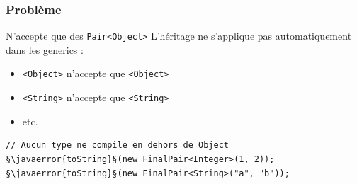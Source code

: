 \documentclass[draft]{beamer}
\makeatletter
\def\uwave{\bgroup\markoverwith{\lower4\p@\hbox{\sixly \textcolor{errorcolor}{\char58}}}\ULon}
\newcommand{\javaerror}[1]{%
  \uwave{#1}%
}
\makeatother
\begin{document}
\begin{frame}[fragile]
\frametitle{Problème}
\begin{alertblock}{N'accepte que des \lstinline{Pair<Object>}}
 L'héritage ne s'applique pas automatiquement dans les generics :
 \begin{itemize}
  \item \lstinline{<Object>} n'accepte que \lstinline{<Object>}
  \item \lstinline{<String>} n'accepte que \lstinline{<String>}
  \item etc.
 \end{itemize}
\end{alertblock}
\begin{lstlisting}
// Aucun type ne compile en dehors de Object
§\javaerror{toString}§(new FinalPair<Integer>(1, 2));
§\javaerror{toString}§(new FinalPair<String>("a", "b"));
\end{lstlisting}
\end{frame}
\end{document}
